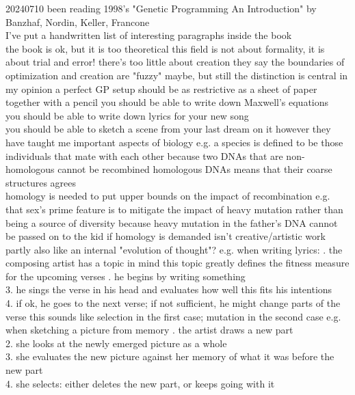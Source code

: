 \documentclass{article}\usepackage[margin=2cm]{geometry}
\begin{document}
\begin{cascade}
    20240710
    \stepin
    been reading 1998's "Genetic Programming An Introduction" by Banzhaf, Nordin, Keller, Francone \\
    I've put a handwritten list of interesting paragraphs inside the book\\
    the book is ok, but it is too theoretical
    \stepin
    this field is not about formality, it is about trial and error!
    \stepout
    there's too little about creation
    \stepin
    they say the boundaries of optimization and creation are "fuzzy"
    \stepin
    maybe, but still the distinction is central in my opinion
    \stepout
    a perfect GP setup should be as restrictive as a sheet of paper together with a pencil
    \stepin
    you should be able to write down Maxwell's equations\\
    you should be able to write down lyrics for your new song\\
    you should be able to sketch a scene from your last dream on it
    \stepout
    \stepout
    however they have taught me important aspects of biology
    \stepin
    e.g. a species is defined to be those individuals that mate with each other
    \stepin
    because two DNAs that are non-homologous cannot be recombined
    \stepin
    homologous DNAs means that their coarse structures agrees\\
    homology is needed to put upper bounds on the impact of recombination
    \stepout
    \stepout
    e.g. that sex's prime feature is to mitigate the impact of heavy mutation rather than being a source of diversity
    \stepin
    because heavy mutation in the father's DNA cannot be passed on to the kid if homology is demanded
    \stepout
    \stepout
    isn't creative/artistic work partly also like an internal "evolution of thought"?
    \stepin
    e.g. when writing lyrics:
    . the composing artist has a topic in mind
    \stepin
    this topic greatly defines the fitness measure for the upcoming verses
    . he begins by writing something\\
    3. he sings the verse in his head and evaluates how well this fits his intentions\\
    4. if ok, he goes to the next verse; if not sufficient, he might change parts of the verse
    \stepin
    this sounds like selection in the first case; mutation in the second case
    \stepout
    \stepout
    e.g. when sketching a picture from memory
    . the artist draws a new part\\
    2. she looks at the newly emerged picture as a whole\\
    3. she evaluates the new picture against her memory of what it was before the new part\\
    4. she selects: either deletes the new part, or keeps going with it
\end{cascade}
\end{document}
